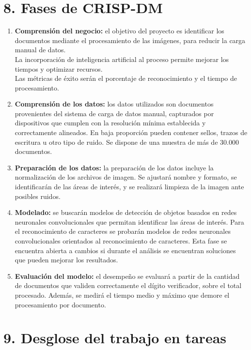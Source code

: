 \documentclass[
11pt, %
]{charter}
\begin{document}
\section{8. Fases de CRISP-DM}

\begin{enumerate}
  \item \textbf{Comprensión del negocio:} el objetivo del proyecto es identificar los documentos mediante el procesamiento de las imágenes, para reducir la carga manual de datos. \\
  La incorporación de inteligencia artificial al proceso permite mejorar los tiempos y optimizar recursos. \\
  Las métricas de éxito serán el porcentaje de reconocimiento y el tiempo de procesamiento.
  \item \textbf{Comprensión de los datos:} los datos utilizados son documentos provenientes del sistema de carga de datos manual, capturados por dispositivos que cumplen con la resolución mínima establecida y correctamente alineados. En baja proporción pueden contener sellos, trazos de escritura u otro tipo de ruido. Se dispone de una muestra de más de 30.000 documentos.
  \item \textbf{Preparación de los datos:} la preparación de los datos incluye la normalización de los archivos de imagen. Se ajustará nombre y formato, se identificarán de las áreas de interés, y se realizará limpieza de la imagen ante posibles ruidos.
  \item \textbf{Modelado:} se buscarán modelos de detección de objetos basados en redes neuronales convolucionales que permitan identificar las áreas de interés. Para el reconocimiento de caracteres se probarán modelos de redes neuronales convolucionales orientados al reconocimiento de caracteres. Esta fase se encuentra abierta a cambios si durante el análisis se encuentran soluciones que pueden mejorar los resultados.
  \item \textbf{Evaluación del modelo:} el desempeño se evaluará a partir de la cantidad de documentos que validen correctamente el dígito verificador, sobre el total procesado. Además, se medirá el tiempo medio y máximo que demore el procesamiento por documento.
\end{enumerate}

\newpage
\section{9. Desglose del trabajo en tareas}
\label{sec:wbs}
\end{document}
